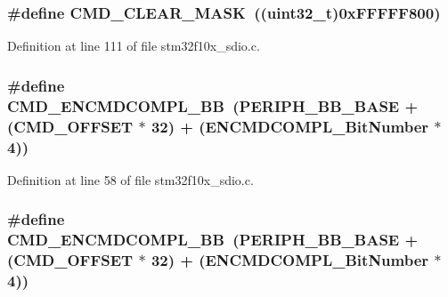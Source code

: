 \subsubsection[{\texorpdfstring{C\+M\+D\+\_\+\+C\+L\+E\+A\+R\+\_\+\+M\+A\+SK}{CMD_CLEAR_MASK}}]{\setlength{\rightskip}{0pt plus 5cm}\#define C\+M\+D\+\_\+\+C\+L\+E\+A\+R\+\_\+\+M\+A\+SK~(({\bf uint32\+\_\+t})0x\+F\+F\+F\+F\+F800)}\hypertarget{group___s_d_i_o___private___types_definitions_ga2325d77090e44221b07f8fba5bc9217e}{}\label{group___s_d_i_o___private___types_definitions_ga2325d77090e44221b07f8fba5bc9217e}


Definition at line 111 of file stm32f10x\+\_\+sdio.\+c.

\subsubsection[{\texorpdfstring{C\+M\+D\+\_\+\+E\+N\+C\+M\+D\+C\+O\+M\+P\+L\+\_\+\+BB}{CMD_ENCMDCOMPL_BB}}]{\setlength{\rightskip}{0pt plus 5cm}\#define C\+M\+D\+\_\+\+E\+N\+C\+M\+D\+C\+O\+M\+P\+L\+\_\+\+BB~({\bf P\+E\+R\+I\+P\+H\+\_\+\+B\+B\+\_\+\+B\+A\+SE} + ({\bf C\+M\+D\+\_\+\+O\+F\+F\+S\+ET} $\ast$ 32) + ({\bf E\+N\+C\+M\+D\+C\+O\+M\+P\+L\+\_\+\+Bit\+Number} $\ast$ 4))}\hypertarget{group___s_d_i_o___private___types_definitions_gade06098d1616639ce5f1b70675280b7c}{}\label{group___s_d_i_o___private___types_definitions_gade06098d1616639ce5f1b70675280b7c}


Definition at line 58 of file stm32f10x\+\_\+sdio.\+c.

\subsubsection[{\texorpdfstring{C\+M\+D\+\_\+\+E\+N\+C\+M\+D\+C\+O\+M\+P\+L\+\_\+\+BB}{CMD_ENCMDCOMPL_BB}}]{\setlength{\rightskip}{0pt plus 5cm}\#define C\+M\+D\+\_\+\+E\+N\+C\+M\+D\+C\+O\+M\+P\+L\+\_\+\+BB~({\bf P\+E\+R\+I\+P\+H\+\_\+\+B\+B\+\_\+\+B\+A\+SE} + ({\bf C\+M\+D\+\_\+\+O\+F\+F\+S\+ET} $\ast$ 32) + ({\bf E\+N\+C\+M\+D\+C\+O\+M\+P\+L\+\_\+\+Bit\+Number} $\ast$ 4))}\hypertarget{group___s_d_i_o___private___types_definitions_gade06098d1616639ce5f1b70675280b7c}{}\label{group___s_d_i_o___private___types_definitions_gade06098d1616639ce5f1b70675280b7c}


